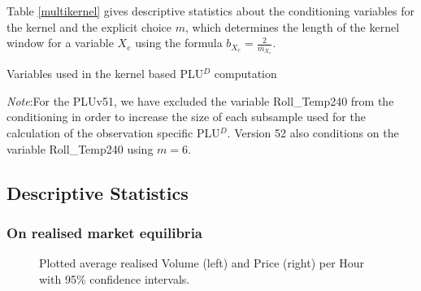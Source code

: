 Table \ref{multikernel} gives descriptive statistics about the conditioning variables for the kernel and the explicit choice $m$, which determines the length of the kernel window for a variable $X_e$ using the formula $b_{X_e} = \frac{2}{m_{X_e}}$.


\begin{table}[!ht]
\vspace{-0cm}

\caption{\label{multikernel} Variables used in the kernel based PLU$^D$ computation}
\emph{Note}:For the PLUv51, we have excluded the variable Roll\_Temp240 from the conditioning in order to increase the size of each subsample used for the calculation of the observation specific PLU$^D$. Version 52 also conditions on the variable Roll\_Temp240 using $m=6$.
\end{table}






\subsection{Descriptive Statistics}
\label{statdes}
\subsubsection{On realised market equilibria}
\begin{figure}[H]
\begin{center} 
\end{center}
\caption{\small Plotted average realised Volume (left) and Price (right) per Hour with 95\% confidence intervals.}
\label{EquilVolPriperHour}
\end{figure}


